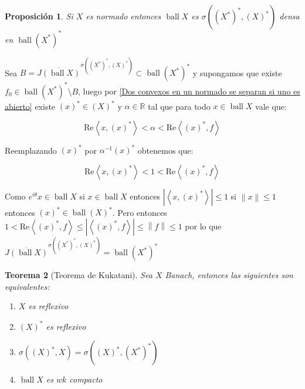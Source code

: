 \documentclass[11pt]{article}
\newcommand{\R}{{\mathbb{R}}}
\newcommand{\dual}[1]{\left(#1\right)^{\ast}}
\newcommand{\ddual}[1]{\left(#1^{\ast}\right)^{\ast}}
\newcommand{\norm}[1]{\left\lVert#1\right\rVert}
\newcommand{\abs}[1]{\left\lvert#1\right\rvert}
\newcommand{\ip}[1]{\left\langle#1\right\rangle}
\DeclareMathOperator{\ball}{ball}
\newtheorem{theorem}{Teorema}
\numberwithin{theorem}{subsection}
\newtheorem{proposition}[theorem]{Proposici\'on}
\newenvironment{proof}[1][Demostraci\'on]{\begin{trivlist}
		\item[\hskip \labelsep {\bfseries #1}]}{\end{trivlist}}
\newcommand{\qed}{\nobreak \ifvmode \relax \else
	\ifdim\lastskip<1.5em \hskip-\lastskip
	\hskip1.5em plus0em minus0.5em \fi \nobreak
	\vrule height0.75em width0.5em depth0.25em\fi}
\begin{document}
\begin{proposition}
	\label{Lemma: Teorema de Kukatani}
	Si $X$ es normado entonces $\ball X$ es $\sigma\left(\ddual{X}, \dual{X}\right)$ densa en $\ball \ddual{X}$
\end{proposition}

\begin{proof}
	Sea $B = \overline{J(\ball X)}^{\sigma(\ddual{X}, \dual{X})} \subset \ball \ddual{X}$ y supongamos que existe $f_0 \in \ball \ddual{X} \setminus B$,  luego por \ref{Dos convexos en un normado se separan si uno es abierto} existe $\dual{x} \in \dual{X}$ y $\alpha \in \R$ tal que para todo $x \in \ball X$ vale que:
	
	\[
	\text{Re} {\ip{x,\dual{x}}} < \alpha < \text{Re}\ip{\dual{x}, f}
	\]
	
	Reemplazando $\dual{x}$ por $\alpha^{-1} \dual{x}$ obtenemos que:
	
	\[
	\text{Re} {\ip{x,\dual{x}}} < 1 < \text{Re}\ip{\dual{x}, f}
	\]
	
	Como $e^{i\theta}x \in \ball X$ si $x \in \ball X$ entonces $\abs{\ip{x,\dual{x}}} \leq 1$ si $\norm{x} \leq 1$ entonces $\dual{x} \in \ball \dual{X}$. Pero entonces $1 < \text{Re} \ip{\dual{x}, f} \leq \abs{\ip{\dual{x}, f}} \leq \norm{f} \leq 1$ por lo que $\overline{J(\ball X)}^{\sigma(\ddual{X}, \dual{X})} = \ball \ddual{X}$\qed
	
\end{proof}

\begin{theorem}[Teorema de Kukatani]
	\label{Teorema de Kukatani}
	Sea $X$ Banach, entonces las siguientes son equivalentes:
	
	\begin{enumerate}
		\item $X$ es reflexivo
		\item $\dual{X}$ es reflexivo
		\item $\sigma\left(\dual{X}, X\right) = \sigma \left(\dual{X}, \ddual{X}\right)$
		\item $\ball X$ es $wk$ compacto
	\end{enumerate}
	
\end{theorem}
\end{document}
